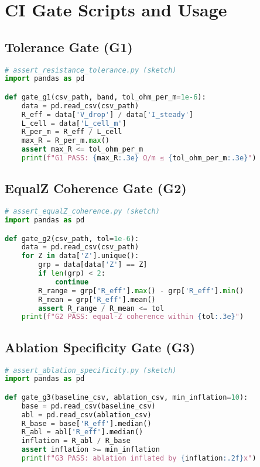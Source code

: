 \documentclass[11pt,a4paper]{article}
\begin{document}
\section{CI Gate Scripts and Usage}
\label{app:ci}
\subsection{Tolerance Gate (G1)}
\begin{lstlisting}[language=Python]
# assert_resistance_tolerance.py (sketch)
import pandas as pd

def gate_g1(csv_path, band, tol_ohm_per_m=1e-6):
    data = pd.read_csv(csv_path)
    R_eff = data['V_drop'] / data['I_steady']
    L_cell = data['L_cell_m']
    R_per_m = R_eff / L_cell
    max_R = R_per_m.max()
    assert max_R <= tol_ohm_per_m
    print(f"G1 PASS: {max_R:.3e} Ω/m ≤ {tol_ohm_per_m:.3e}")
\end{lstlisting}

\subsection{Equal\textendash Z Coherence Gate (G2)}
\begin{lstlisting}[language=Python]
# assert_equalZ_coherence.py (sketch)
import pandas as pd

def gate_g2(csv_path, tol=1e-6):
    data = pd.read_csv(csv_path)
    for Z in data['Z'].unique():
        grp = data[data['Z'] == Z]
        if len(grp) < 2:
            continue
        R_range = grp['R_eff'].max() - grp['R_eff'].min()
        R_mean = grp['R_eff'].mean()
        assert R_range / R_mean <= tol
    print(f"G2 PASS: equal-Z coherence within {tol:.3e}")
\end{lstlisting}

\subsection{Ablation Specificity Gate (G3)}
\begin{lstlisting}[language=Python]
# assert_ablation_specificity.py (sketch)
import pandas as pd

def gate_g3(baseline_csv, ablation_csv, min_inflation=10):
    base = pd.read_csv(baseline_csv)
    abl = pd.read_csv(ablation_csv)
    R_base = base['R_eff'].median()
    R_abl = abl['R_eff'].median()
    inflation = R_abl / R_base
    assert inflation >= min_inflation
    print(f"G3 PASS: ablation inflated by {inflation:.2f}x")
\end{lstlisting}
\end{document}
